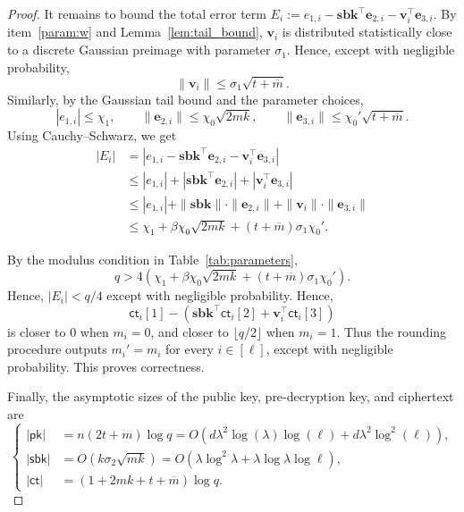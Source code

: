 \begin{proof}
It remains to bound the total error term
$
    E_i
    :=
    e_{1,i}
    -
    \mathbf{sbk}^{\top}\mathbf{e}_{2,i}
    -
    \mathbf{v}_i^{\top}\mathbf{e}_{3,i}.
$
By item~\ref{param:w} and Lemma~\ref{lem:tail_bound},
$\mathbf{v}_i$ is distributed statistically close to a discrete Gaussian
preimage with parameter $\sigma_1$. Hence, except with negligible
probability,
\[
    \|\mathbf{v}_i\|
    \le
    \sigma_1\sqrt{t+\overline m}.
\]
Similarly, by the Gaussian tail bound and the parameter choices,
\[
    |e_{1,i}|\le \chi_1,
    \qquad
    \|\mathbf{e}_{2,i}\|\le \chi_0\sqrt{2mk},
    \qquad
    \|\mathbf{e}_{3,i}\|\le \chi_0'\sqrt{t+\overline m}.
\]
Using Cauchy--Schwarz, we get
\[
\begin{aligned}
    |E_i|
    &=
    \left|
        e_{1,i}
        -
        \mathbf{sbk}^{\top}\mathbf{e}_{2,i}
        -
        \mathbf{v}_i^{\top}\mathbf{e}_{3,i}
    \right|
    \\
    &\le
    |e_{1,i}|
    +
    \left|
        \mathbf{sbk}^{\top}\mathbf{e}_{2,i}
    \right|
    +
    \left|
        \mathbf{v}_i^{\top}\mathbf{e}_{3,i}
    \right|
    \\
    &\le
    |e_{1,i}|
    +
    \|\mathbf{sbk}\|\cdot\|\mathbf{e}_{2,i}\|
    +
    \|\mathbf{v}_i\|\cdot\|\mathbf{e}_{3,i}\|
    \\
    &\le
    \chi_1
    +
    \beta\chi_0\sqrt{2mk}
    +
    (t+\overline m)\sigma_1\chi_0'.
\end{aligned}
\]

By the modulus condition in Table~\ref{tab:parameters},
\[
    q
    >
    4\left(
        \chi_1
        +
        \beta\chi_0\sqrt{2mk}
        +
        (t+\overline m)\sigma_1\chi_0'
    \right).
\]
Hence,
$
    |E_i| < q/4
$
except with negligible probability. Hence,
\[
    \mathsf{ct}_i[1]
    -
    \left(
        \mathbf{sbk}^{\top}\mathsf{ct}_i[2]
        +
        \mathbf{v}_i^{\top}\mathsf{ct}_i[3]
    \right)
\]
is closer to \(0\) when \(m_i=0\), and closer to \(\lfloor q/2\rfloor\)
when \(m_i=1\). Thus the rounding procedure outputs
$
    m_i'=m_i
$
for every \(i\in[\ell]\), except with negligible probability. This proves
correctness.

Finally, the asymptotic sizes of the public key, pre-decryption key, and
ciphertext are
\[
\left\{
\begin{aligned}
|\mathsf{pk}|
&=
n(2t+m)\log q
=
O\!\left(
d\lambda^2\log(\lambda)\log(\ell)
+
d\lambda^2\log^2(\ell)
\right),
\\[0.4em]
|\mathsf{sbk}|
&=
O(k\sigma_2\sqrt{mk})
=
O\!\left(
\lambda\log^2\lambda
+
\lambda\log\lambda\log\ell
\right),
\\[0.4em]
|\mathsf{ct}|
&=
(1+2mk+t+\overline m)\log q.
\end{aligned}
\right.
\]
\end{proof}
% 